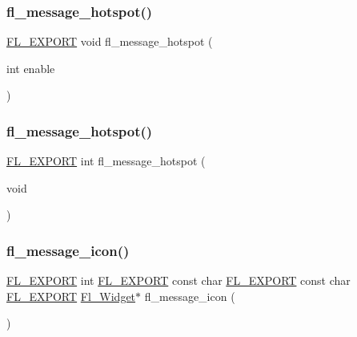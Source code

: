 \mbox{\label{fl__ask_8_h_a8ddef2e74d830bec4b1192a0b157b9de}} 
\subsubsection{\texorpdfstring{fl\+\_\+message\+\_\+hotspot()}{fl\_message\_hotspot()}\hspace{0.1cm}{\footnotesize\ttfamily [1/2]}}
{\footnotesize\ttfamily \hyperlink{_fl___export_8_h_aa9ba29a18aee9d738370a06eeb4470fc}{F\+L\+\_\+\+E\+X\+P\+O\+RT} void fl\+\_\+message\+\_\+hotspot (\begin{DoxyParamCaption}\item[{int}]{enable }\end{DoxyParamCaption})}

\mbox{\label{fl__ask_8_h_aeafed56c84b8f5c9bbc98104411a8aef}} 
\subsubsection{\texorpdfstring{fl\+\_\+message\+\_\+hotspot()}{fl\_message\_hotspot()}\hspace{0.1cm}{\footnotesize\ttfamily [2/2]}}
{\footnotesize\ttfamily \hyperlink{_fl___export_8_h_aa9ba29a18aee9d738370a06eeb4470fc}{F\+L\+\_\+\+E\+X\+P\+O\+RT} int fl\+\_\+message\+\_\+hotspot (\begin{DoxyParamCaption}\item[{void}]{ }\end{DoxyParamCaption})}

\mbox{\label{fl__ask_8_h_a17d85f096a3f0239aec1c16e7778aac7}} 
\subsubsection{\texorpdfstring{fl\+\_\+message\+\_\+icon()}{fl\_message\_icon()}}
{\footnotesize\ttfamily \hyperlink{_fl___export_8_h_aa9ba29a18aee9d738370a06eeb4470fc}{F\+L\+\_\+\+E\+X\+P\+O\+RT} int \hyperlink{_fl___export_8_h_aa9ba29a18aee9d738370a06eeb4470fc}{F\+L\+\_\+\+E\+X\+P\+O\+RT} const char \hyperlink{_fl___export_8_h_aa9ba29a18aee9d738370a06eeb4470fc}{F\+L\+\_\+\+E\+X\+P\+O\+RT} const char \hyperlink{_fl___export_8_h_aa9ba29a18aee9d738370a06eeb4470fc}{F\+L\+\_\+\+E\+X\+P\+O\+RT} \hyperlink{class_fl___widget}{Fl\+\_\+\+Widget}$\ast$ fl\+\_\+message\+\_\+icon (\begin{DoxyParamCaption}{ }\end{DoxyParamCaption})}

